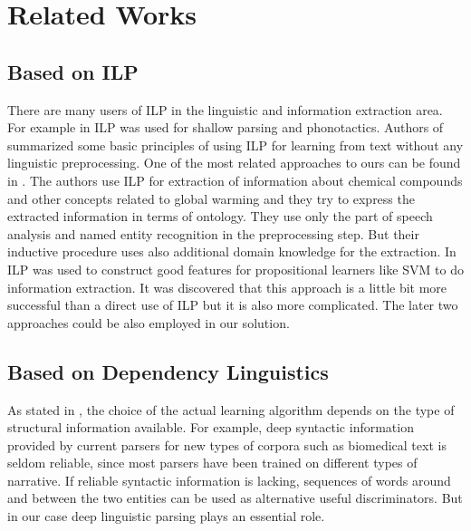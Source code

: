 \chapter{Related Works}

\section{Based on ILP}
There are many users of ILP in the linguistic and information extraction area.
For example in \citep{stasinos:phd} ILP was used for shallow parsing and phonotactics.
Authors of \citep{Junker99learningfor} summarized some basic principles of using ILP for learning from text without any linguistic preprocessing. One of the most related approaches to ours can be found in \citep{aitken02:_learn_infor_extrac_rules}. The authors use ILP for extraction of information about chemical compounds and other concepts related to global warming and they try to express the extracted information in terms of ontology. They use only the part of speech analysis and named entity recognition in the preprocessing step. But their inductive procedure uses also additional domain knowledge for the extraction. In \citep{Ramakrishnan:UsingILPforFeatures} ILP was used to construct good features for propositional learners like SVM to do information extraction. It was discovered that this approach is a little bit more successful than a direct use of ILP but it is also more complicated. The later two approaches could be also employed in our solution.

\section{Based on Dependency Linguistics}
As stated in \citep{Bunescu:phd}, the choice of the actual learning algorithm depends on the type of structural information available. For example, deep syntactic information provided by current parsers for new types of corpora such as biomedical text is seldom reliable, since most parsers have been trained on different types of narrative. If reliable syntactic information is lacking, sequences of words around and between the two entities can be used as alternative useful discriminators.
But in our case deep linguistic parsing plays an essential role.


